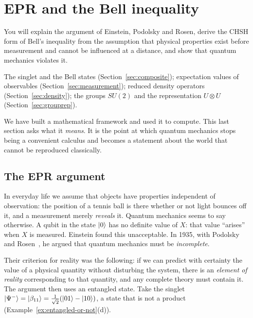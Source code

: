 \section{EPR and the Bell inequality}\label{sec:bell}

\begin{objectives}
  You will explain the argument of Einstein, Podolsky and Rosen, derive the CHSH form of Bell's inequality from the assumption that
  physical properties exist before measurement and cannot be influenced at a distance, and show that quantum mechanics violates it.
\end{objectives}

\begin{recall}
  The singlet and the Bell states (Section~\ref{sec:composite}); expectation values of observables (Section~\ref{sec:measurement}); reduced density operators (Section~\ref{sec:density}); the groups $SU(2)$ and the representation $U\otimes U$ (Section~\ref{sec:grouprep}).
\end{recall}


We have built a mathematical framework and used it to compute. This last section asks what it \emph{means}. It is the point at which quantum mechanics stops being a convenient calculus and becomes a statement about the world that cannot be reproduced classically.

\subsection{The EPR argument}

In everyday life we assume that objects have properties independent of observation: the position of a tennis ball is there whether or not light bounces off it, and a measurement merely \emph{reveals} it.
Quantum mechanics seems to say otherwise. A qubit in the state $\left|0\right\rangle$ has no definite value of $X$: that value ``arises'' when $X$ is measured. Einstein found this unacceptable. In 1935, with Podolsky and Rosen~\cite{epr1935}, he argued that quantum mechanics must be \emph{incomplete}.

Their criterion for reality was the following: if we can predict with certainty the value of a physical quantity without disturbing the system, there is an \emph{element of reality} corresponding to that quantity, and any complete theory must contain it. The argument then uses an entangled state.
Take the singlet $\left|\Psi^-\right\rangle=\left|\beta_{11}\right\rangle=\frac1{\sqrt2}(\left|01\right\rangle-\left|10\right\rangle)$, a state that is not a product (Example~\ref{ex:entangled-or-not}(d)).

